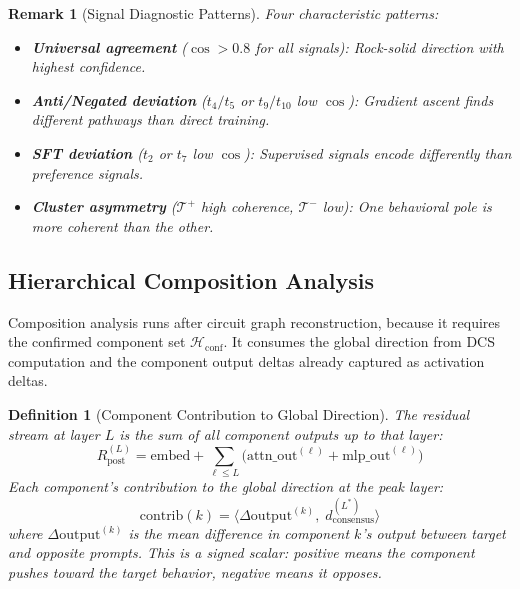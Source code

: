 \documentclass[11pt]{article}
\newtheorem{definition}{Definition}[section]
\newtheorem{remark}{Remark}[section]
\begin{document}
\begin{remark}[Signal Diagnostic Patterns]
Four characteristic patterns:
\begin{itemize}[nosep]
\item \textbf{Universal agreement} ($\cos > 0.8$ for all signals): Rock-solid direction with highest confidence.
\item \textbf{Anti/Negated deviation} ($t_4/t_5$ or $t_9/t_{10}$ low $\cos$): Gradient ascent finds different pathways than direct training.
\item \textbf{SFT deviation} ($t_2$ or $t_7$ low $\cos$): Supervised signals encode differently than preference signals.
\item \textbf{Cluster asymmetry} ($\mathcal{T}^+$ high coherence, $\mathcal{T}^-$ low): One behavioral pole is more coherent than the other.
\end{itemize}
\end{remark}

\subsection{Hierarchical Composition Analysis}
\label{app:composition-analysis}

Composition analysis runs after circuit graph reconstruction, because it requires the confirmed component set $\mathcal{H}_{\text{conf}}$. It consumes the global direction from DCS computation and the component output deltas already captured as activation deltas.

\begin{definition}[Component Contribution to Global Direction]
\label{def:direction-contribution}
The residual stream at layer $L$ is the sum of all component outputs up to that layer:
\begin{equation}
R^{(L)}_{\text{post}} = \text{embed} + \sum_{\ell \leq L} \bigl(\text{attn\_out}^{(\ell)} + \text{mlp\_out}^{(\ell)}\bigr)
\end{equation}
Each component's contribution to the global direction at the peak layer:
\begin{equation}
\text{contrib}(k) = \langle \Delta\text{output}^{(k)},\; d^{(L^*)}_{\text{consensus}} \rangle
\end{equation}
where $\Delta\text{output}^{(k)}$ is the mean difference in component $k$'s output between target and opposite prompts. This is a signed scalar: positive means the component pushes toward the target behavior, negative means it opposes.
\end{definition}
\end{document}
